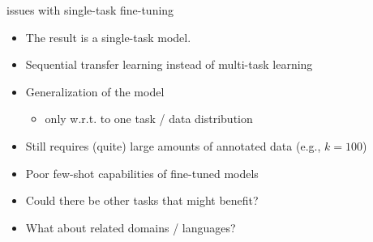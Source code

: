 
\begin{frame}{issues with single-task fine-tuning}

\vfill

\begin{itemize}
    \item The result is a single-task model.
\item Sequential transfer learning instead of multi-task learning
    \item Generalization of the model 
        \begin{itemize}
            \item only w.r.t. to one task / data distribution
        \end{itemize} 
    \item Still requires (quite) large amounts of annotated
        data (e.g., $k=100$)
    \item Poor few-shot capabilities of fine-tuned models
            \item \ques Could there be other tasks that
        might benefit?
            \item \ques What about related domains / languages?
\end{itemize}

\vfill

\end{frame}

